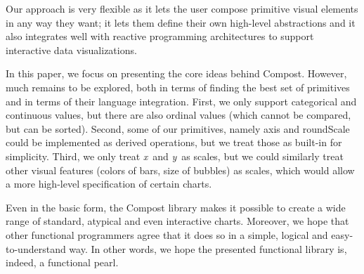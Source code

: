 \documentclass{jfp}
\newcommand{\X}{\emph{x}\ }
\newcommand{\Y}{\emph{y}\ }
\newcommand{\kvd}[1]{\textnormal{\textcolor{kvdclr}{\sffamily #1}}}
\begin{document}
Our approach is very flexible as it lets the user compose primitive visual elements in any
way they want; it lets them define their own high-level abstractions and it also integrates well
with reactive programming architectures to support interactive data visualizations.

In this paper, we focus on presenting the core ideas behind Compost. However, much
remains to be explored, both in terms of finding the best set of primitives and in terms of
their language integration. First, we only support categorical and continuous values, but
there are also ordinal values (which cannot be compared, but can be sorted). Second, some of our
primitives, namely \kvd{axis} and \kvd{roundScale} could be implemented as derived operations, but
we treat those as built-in for simplicity. Third, we only treat \X and \Y as scales, but we could
similarly treat other visual features (colors of bars, size of bubbles) as scales, which would
allow a more high-level specification of certain charts.

Even in the basic form, the Compost library makes it possible to
create a wide range of standard, atypical and even interactive charts. Moreover, we hope that
other functional programmers agree that it does so in a simple, logical and easy-to-understand way.
In other words, we hope the presented functional library is, indeed, a functional pearl.



\end{document}
